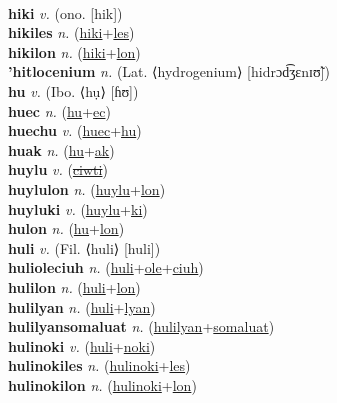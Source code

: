  \label{hihinak} \\
\textbf{hiki} \textit{v.} (ono. [hik])
 \label{hiki} \\
\textbf{hikiles} \textit{n.} (\hyperref[hiki]{hiki}+\hyperref[les]{les})
 \label{hikiles} \\
\textbf{hikilon} \textit{n.} (\hyperref[hiki]{hiki}+\hyperref[lon]{lon})
 \label{hikilon} \\
\textbf{'hitlocenium} \textit{n.} (Lat. ⟨hydrogenium⟩ [hidrɔd͡ʒɛnɪʊ̃])
 \label{'hitlocenium} \\
\textbf{hu} \textit{v.} (Ibo. ⟨hụ⟩ [ɦʊ])
 \label{hu} \\
\textbf{huec} \textit{n.} (\hyperref[hu]{hu}+\hyperref[ec]{ec})
 \label{huec} \\
\textbf{huechu} \textit{v.} (\hyperref[huec]{huec}+\hyperref[hu]{hu})
 \label{huechu} \\
\textbf{huak} \textit{n.} (\hyperref[hu]{hu}+\hyperref[ak]{ak})
 \label{huak} \\
\textbf{huylu} \textit{v.} (\hyperref[ciwti]{\sout{ciwti}})
 \label{huylu} \\
\textbf{huylulon} \textit{n.} (\hyperref[huylu]{huylu}+\hyperref[lon]{lon})
 \label{huylulon} \\
\textbf{huyluki} \textit{v.} (\hyperref[huylu]{huylu}+\hyperref[ki]{ki})
 \label{huyluki} \\
\textbf{hulon} \textit{n.} (\hyperref[hu]{hu}+\hyperref[lon]{lon})
 \label{hulon} \\
\textbf{huli} \textit{v.} (Fil. ⟨huli⟩ [huli])
 \label{huli} \\
\textbf{hulioleciuh} \textit{n.} (\hyperref[huli]{huli}+\hyperref[ole]{ole}+\hyperref[ciuh]{ciuh})
 \label{hulioleciuh} \\
\textbf{hulilon} \textit{n.} (\hyperref[huli]{huli}+\hyperref[lon]{lon})
 \label{hulilon} \\
\textbf{hulilyan} \textit{n.} (\hyperref[huli]{huli}+\hyperref[lyan]{lyan})
 \label{hulilyan} \\
\textbf{hulilyansomaluat} \textit{n.} (\hyperref[hulilyan]{hulilyan}+\hyperref[somaluat]{somaluat})
 \label{hulilyansomaluat} \\
\textbf{hulinoki} \textit{v.} (\hyperref[huli]{huli}+\hyperref[noki]{noki})
 \label{hulinoki} \\
\textbf{hulinokiles} \textit{n.} (\hyperref[hulinoki]{hulinoki}+\hyperref[les]{les})
 \label{hulinokiles} \\
\textbf{hulinokilon} \textit{n.} (\hyperref[hulinoki]{hulinoki}+\hyperref[lon]{lon})
